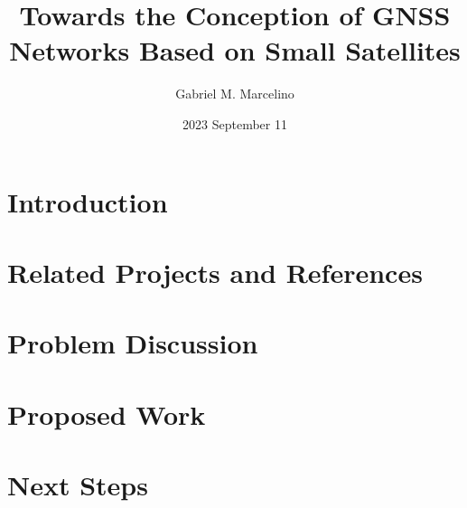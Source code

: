 \documentclass{beamer}
\title[Presentation]{Towards the Conception of GNSS Networks Based on Small Satellites}
\author[SpaceLab]{Gabriel M. Marcelino}
\institute[]{SpaceLab - UFSC}
\date{2023 September 11}
\begin{document}
    
    

    \section{Introduction}

        

    \section{Related Projects and References}

        

    \section{Problem Discussion}

        

    \section{Proposed Work}

        

    \section{Next Steps}

        

\end{document}
